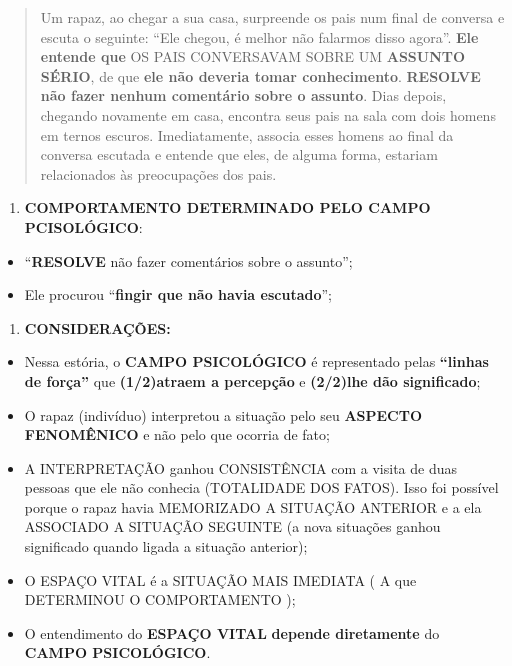 \documentclass[
]{book}
\providecommand{\tightlist}{%
  \setlength{\itemsep}{0pt}\setlength{\parskip}{0pt}}
\begin{document}
\begin{quote}
Um rapaz, ao chegar a sua casa, surpreende os pais num final de conversa e escuta o seguinte: ``Ele chegou, é melhor não falarmos disso agora''. \textbf{Ele entende que} OS PAIS CONVERSAVAM SOBRE UM \textbf{ASSUNTO SÉRIO}, de que \textbf{ele não deveria tomar conhecimento}. \textbf{RESOLVE não fazer nenhum comentário sobre o assunto}. Dias depois, chegando novamente em casa, encontra seus pais na sala com dois homens em ternos escuros. Imediatamente, associa esses homens ao final da conversa escutada e entende que eles, de alguma forma, estariam relacionados às preocupações dos pais.
\end{quote}

\begin{enumerate}
\def\labelenumi{\arabic{enumi}.}
\setcounter{enumi}{1}
\tightlist
\item
  \textbf{COMPORTAMENTO DETERMINADO PELO CAMPO PCISOLÓGICO}:
\end{enumerate}

\begin{itemize}
\tightlist
\item
  ``\textbf{RESOLVE} não fazer comentários sobre o assunto'';
\item
  Ele procurou ``\textbf{fingir que não havia escutado}'';
\end{itemize}

\begin{enumerate}
\def\labelenumi{\arabic{enumi}.}
\setcounter{enumi}{2}
\tightlist
\item
  \textbf{CONSIDERAÇÕES:}
\end{enumerate}

\begin{itemize}
\tightlist
\item
  Nessa estória, o \textbf{CAMPO PSICOLÓGICO} é representado pelas \textbf{``linhas de força''} que \textbf{(1/2)atraem a percepção} e \textbf{(2/2)lhe dão significado};
\item
  O rapaz (indivíduo) interpretou a situação pelo seu \textbf{ASPECTO FENOMÊNICO} e não pelo que ocorria de fato;
\item
  A INTERPRETAÇÃO ganhou CONSISTÊNCIA com a visita de duas pessoas que ele não conhecia (TOTALIDADE DOS FATOS). Isso foi possível porque o rapaz havia MEMORIZADO A SITUAÇÃO ANTERIOR e a ela ASSOCIADO A SITUAÇÃO SEGUINTE (a nova situações ganhou significado quando ligada a situação anterior);
\item
  O ESPAÇO VITAL é a SITUAÇÃO MAIS IMEDIATA ( A que DETERMINOU O COMPORTAMENTO );
\item
  O entendimento do \textbf{ESPAÇO VITAL} \textbf{depende diretamente} do \textbf{CAMPO PSICOLÓGICO}.
\end{itemize}
\end{document}
